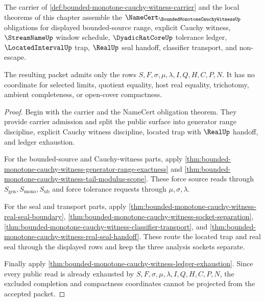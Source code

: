 \begin{theorem}
\label{thm:bounded-monotone-cauchy-witness-obligation-closure}
The carrier of \autoref{def:bounded-monotone-cauchy-witness-carrier} and the local theorems of this chapter assemble the $\NameCert_{\BoundedMonotoneCauchyWitnessUp}$ obligations for displayed bounded-source range, explicit Cauchy witness, $\StreamNameUp$ window schedule, $\DyadicRatCoreUp$ tolerance ledger, $\LocatedIntervalUp$ trap, $\RealUp$ seal handoff, classifier transport, and non-escape.

The resulting packet admits only the rows $S,F,\sigma,\mu,\lambda,I,Q,H,C,P,N$. It has no coordinate for selected limits, quotient equality, host real equality, trichotomy, ambient completeness, or open-cover compactness.
\end{theorem}
\begin{proof}
Begin with the carrier and the NameCert obligation theorem. They provide carrier admission and split the public surface into generator range discipline, explicit Cauchy witness discipline, located trap with $\RealUp$ handoff, and ledger exhaustion.

For the bounded-source and Cauchy-witness parts, apply \autoref{thm:bounded-monotone-cauchy-witness-generator-range-exactness} and \autoref{thm:bounded-monotone-cauchy-witness-tail-modulus-scope}. These force source reads through $S_{\mathrm{gen}},S_{\mathrm{mono}},S_{\mathrm{ub}}$ and force tolerance requests through $\mu,\sigma,\lambda$.

For the seal and transport parts, apply \autoref{thm:bounded-monotone-cauchy-witness-real-seal-boundary}, \autoref{thm:bounded-monotone-cauchy-witness-socket-separation}, \autoref{thm:bounded-monotone-cauchy-witness-classifier-transport}, and \autoref{thm:bounded-monotone-cauchy-witness-real-seal-handoff}. These route the located trap and real seal through the displayed rows and keep the three analysis sockets separate.

Finally apply \autoref{thm:bounded-monotone-cauchy-witness-ledger-exhaustion}. Since every public read is already exhausted by $S,F,\sigma,\mu,\lambda,I,Q,H,C,P,N$, the excluded completion and compactness coordinates cannot be projected from the accepted packet.
\end{proof}



